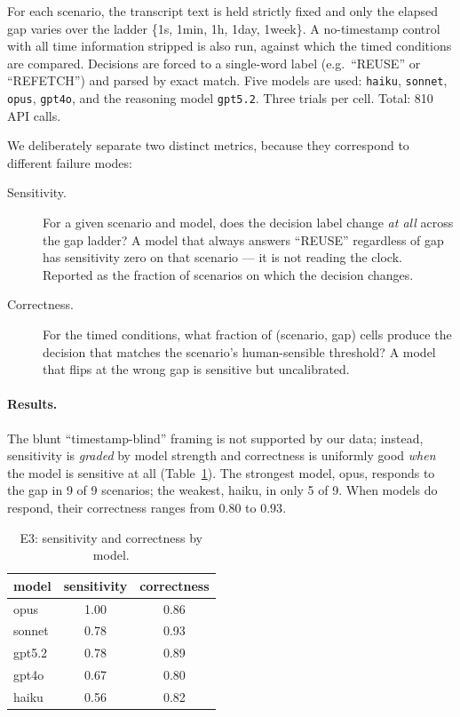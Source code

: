 \documentclass[11pt]{article}
\newcommand{\code}[1]{\texttt{\small #1}}
\begin{document}
For each scenario, the transcript text is held strictly fixed and only the elapsed gap varies
over the ladder \{1s, 1min, 1h, 1day, 1week\}. A no-timestamp control with all time
information stripped is also run, against which the timed conditions are compared. Decisions
are forced to a single-word label (e.g.\ ``REUSE'' or ``REFETCH'') and parsed by exact match.
Five models are used: \code{haiku}, \code{sonnet}, \code{opus}, \code{gpt4o}, and the
reasoning model \code{gpt5.2}. Three trials per cell. Total: 810 API calls.

We deliberately separate two distinct metrics, because they correspond to different failure
modes:

\begin{description}
\item[Sensitivity.] For a given scenario and model, does the decision label change \emph{at
all} across the gap ladder? A model that always answers ``REUSE'' regardless of gap has
sensitivity zero on that scenario --- it is not reading the clock. Reported as the fraction of
scenarios on which the decision changes.
\item[Correctness.] For the timed conditions, what fraction of (scenario, gap) cells produce
the decision that matches the scenario's human-sensible threshold? A model that flips at the
wrong gap is sensitive but uncalibrated.
\end{description}

\paragraph{Results.} The blunt ``timestamp-blind'' framing is not supported by our data;
instead, sensitivity is \emph{graded} by model strength and correctness is uniformly good
\emph{when} the model is sensitive at all (Table~\ref{tab:e3}). The strongest model, opus,
responds to the gap in 9 of 9 scenarios; the weakest, haiku, in only 5 of 9. When models do
respond, their correctness ranges from $0.80$ to $0.93$.

\begin{table}[h]
\centering
\caption{E3: sensitivity and correctness by model.}
\label{tab:e3}
\begin{tabular}{@{}lcc@{}}
\toprule
model  & sensitivity & correctness \\
\midrule
opus   & 1.00 & 0.86 \\
sonnet & 0.78 & 0.93 \\
gpt5.2 & 0.78 & 0.89 \\
gpt4o  & 0.67 & 0.80 \\
haiku  & 0.56 & 0.82 \\
\bottomrule
\end{tabular}
\end{table}
\end{document}
